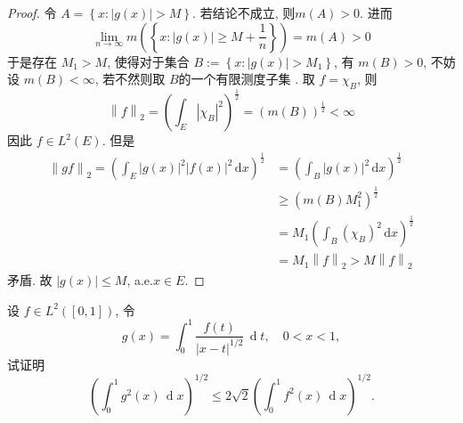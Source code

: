 \documentclass[../main.tex]{subfiles}
\begin{document}
\begin{proof}
令 \(  A= \left\{ x: \left| g\left( x \right)  \right|> M  \right\}  \). 若结论不成立, 则\(  m\left( A \right)> 0   \). 进而 \[
\lim_{n\to \infty}m\left( \left\{ x: \left| g\left( x \right)  \right|\ge  M+ \frac{1 }{n }   \right\} \right) = m\left(A  \right) > 0
\]  于是存在 \(  M_1> M\), 使得对于集合 \( B:=  \left\{ x: \left| g\left( x \right)  \right|>M_1  \right\}  \), 有 \(  m\left( B \right)> 0   \), 不妨设 \(  m\left( B \right)< \infty   \), 若不然则取 \(  B  \)的一个有限测度子集 .   
    取 \(  f= \chi _{B}  \), 则  \[
    \left\| f \right\|_{2}= \left( \int_{E} \left| \chi _{B} \right|^{2} \right) ^{\frac{1}{2}}= \left( m\left( B \right)  \right)^{\frac{1}{2}}< \infty 
    \]因此 \(  f\in L^{2}\left( E \right)   \). 但是 \[
 \begin{aligned}
 \left\| gf \right\|_{2}=  \left(   \int_{E} \left| g\left( x \right)  \right|^{2}\left| f\left( x \right)  \right|^{2}\,\mathrm{d} x \right)   ^{\frac{1}{2}}&= \left( \int_{B}\left| g\left( x \right)  \right|^{2}\,\mathrm{d} x  \right)^{\frac{1}{2}}\\ 
   &\ge \left( m\left( B \right)M_1 ^{2} \right)^{\frac{1}{2}}\\ 
    &=    M_1 \left( \int_{B}\left( \chi _{B} \right)^{2} \,\mathrm{d} x  \right)^{\frac{1}{2}}\\ 
     &= M_1\left\| f \right\|_{2} > M\left\| f \right\|_{2}
 \end{aligned}
    \] 矛盾. 故 \(  \left| g\left( x \right)  \right|\le M   \), a.e.\(  x\in E  \).  
\end{proof}
\begin{exercise}{}{}
设 \(f\in L^2([0,1])\), 令
\[
g(x)=\int_{0}^{1}\frac{f(t)}{\lvert x-t\rvert^{1/2}}\,\operatorname{d}t,\quad 0<x<1,
\]
试证明
\[
\left(\int_{0}^{1}g^2(x)\,\operatorname{d}x\right)^{1/2}
\le 2\sqrt{2}\left(\int_{0}^{1}f^2(x)\,\operatorname{d}x\right)^{1/2}.
\]
\end{exercise}
\end{document}

